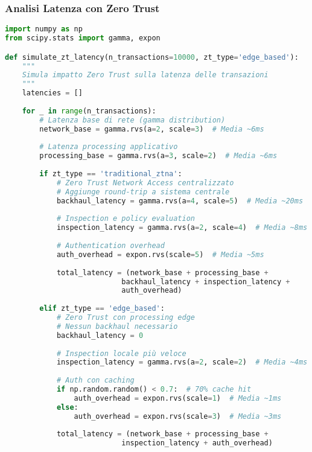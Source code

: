 \subsubsection{Analisi Latenza con Zero Trust}

\begin{lstlisting}[language=Python, caption=Impatto Zero Trust sulla Latenza Transazionale]
import numpy as np
from scipy.stats import gamma, expon

def simulate_zt_latency(n_transactions=10000, zt_type='edge_based'):
    """
    Simula impatto Zero Trust sulla latenza delle transazioni
    """
    latencies = []
    
    for _ in range(n_transactions):
        # Latenza base di rete (gamma distribution)
        network_base = gamma.rvs(a=2, scale=3)  # Media ~6ms
        
        # Latenza processing applicativo
        processing_base = gamma.rvs(a=3, scale=2)  # Media ~6ms
        
        if zt_type == 'traditional_ztna':
            # Zero Trust Network Access centralizzato
            # Aggiunge round-trip a sistema centrale
            backhaul_latency = gamma.rvs(a=4, scale=5)  # Media ~20ms
            
            # Inspection e policy evaluation
            inspection_latency = gamma.rvs(a=2, scale=4)  # Media ~8ms
            
            # Authentication overhead
            auth_overhead = expon.rvs(scale=5)  # Media ~5ms
            
            total_latency = (network_base + processing_base + 
                           backhaul_latency + inspection_latency + 
                           auth_overhead)
            
        elif zt_type == 'edge_based':
            # Zero Trust con processing edge
            # Nessun backhaul necessario
            backhaul_latency = 0
            
            # Inspection locale più veloce
            inspection_latency = gamma.rvs(a=2, scale=2)  # Media ~4ms
            
            # Auth con caching
            if np.random.random() < 0.7:  # 70% cache hit
                auth_overhead = expon.rvs(scale=1)  # Media ~1ms
            else:
                auth_overhead = expon.rvs(scale=3)  # Media ~3ms
            
            total_latency = (network_base + processing_base + 
                           inspection_latency + auth_overhead)
            

\end{lstlisting}
